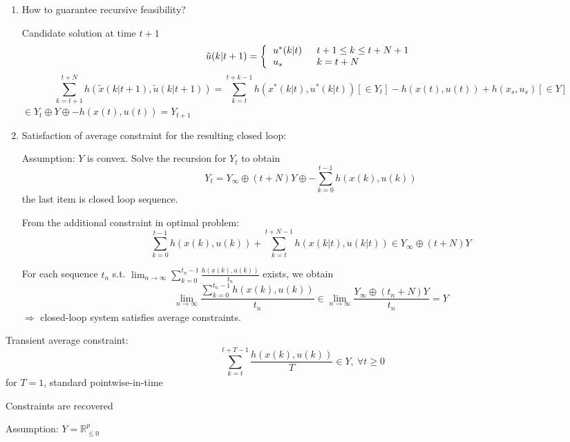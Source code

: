\begin{enumerate}
\item How to guarantee recursive feasibility?

Candidate solution at time $t+1$ 
\begin{equation*}
\tilde{u}(k|t+1) = \left \{
  \begin{tabular}{ll}
  $u^*(k|t)$ & $\ t+1 \leq k \leq t+N+1$ \\
  $u_s$ & $\ k = t + N$
  \end{tabular}
\right .
\end{equation*}
\begin{equation*}
\sum_{k=t+1}^{t+N}h(\tilde{x}(k|t+1), \tilde{u}(k|t+1)) = \sum_{k=t}^{t+k-1}h(x^*(k|t), u^*(k|t))[\in Y_t] - h(x(t),u(t)) + h(x_s,u_s)[\in Y]
\end{equation*}
$\in Y_t \oplus Y \oplus {-h(x(t),u(t))} = Y_{t+1}$
\item Satisfaction of average constraint for the resulting closed loop:

Assumption: $Y$ is convex. Solve the recursion for $Y_t$ to obtain 
\begin{equation*}
Y_t = Y_{\infty} \oplus (t+N)Y \oplus {- \sum_{k=0}^{t-1}h(x(k),u(k))}
\end{equation*}
the last item is closed loop sequence.

From the additional constraint in optimal problem:
\begin{equation*}
\sum_{k=0}^{t-1}h(x(k),u(k)) + \sum_{k=t}^{t+N-1}h(x(k|t), u(k|t)) \in Y_{\infty} \oplus (t+N)Y
\end{equation*}

For each sequence {$t_n$} s.t. $\lim_{n \to \infty} \sum_{k=0}^{t_n -1}\frac{h(x(k),u(k))}{t_n} $ exists, we obtain 
\begin{equation*}
\lim_{n \to \infty} \frac{\sum_{k=0}^{t_n-1}h(x(k),u(k))}{t_n} \in \lim_{n \to \infty} \frac{Y_{\infty} \oplus (t_n + N)Y}{t_n} = Y
\end{equation*}
$\Rightarrow$ closed-loop system satisfies average constraints.
\end{enumerate}

Transient average constraint:
\begin{equation*}
\sum_{k=t}^{t+T-1}\frac{h(x(k),u(k))}{T} \in Y, \ \forall t \geq 0
\end{equation*}
for $T=1$, standard pointwise-in-time 

Constraints are recovered

Assumption: $Y= \mathbb{R}^p_{\leq 0}$

